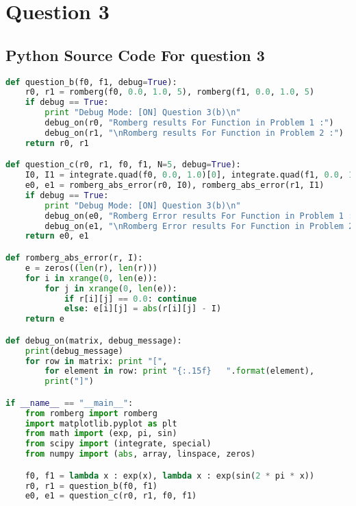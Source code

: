 \documentclass{article}
\begin{document}
\section*{Question 3}
\subsection*{Python Source Code For question 3}
\begin{lstlisting}[language=Python]
def question_b(f0, f1, debug=True):
    r0, r1 = romberg(f0, 0.0, 1.0, 5), romberg(f1, 0.0, 1.0, 5)
    if debug == True:
        print "Debug Mode: [ON] Question 3(b)\n"
        debug_on(r0, "Romberg results For Function in Problem 1 :")
        debug_on(r1, "\nRomberg results For Function in Problem 2 :")
    return r0, r1

def question_c(r0, r1, f0, f1, N=5, debug=True):
    I0, I1 = integrate.quad(f0, 0.0, 1.0)[0], integrate.quad(f1, 0.0, 1.0)[0]
    e0, e1 = romberg_abs_error(r0, I0), romberg_abs_error(r1, I1)
    if debug == True:
        print "Debug Mode: [ON] Question 3(b)\n"
        debug_on(e0, "Romberg Error results For Function in Problem 1 :")
        debug_on(e1, "\nRomberg Error results For Function in Problem 2 :")
    return e0, e1

def romberg_abs_error(r, I):
    e = zeros((len(r), len(r)))
    for i in xrange(0, len(e)):
        for j in xrange(0, len(e)):
            if r[i][j] == 0.0: continue
            else: e[i][j] = abs(r[i][j] - I)
    return e

def debug_on(matrix, debug_message):
    print(debug_message)
    for row in matrix: print "[",
        for element in row: print "{:.15f}   ".format(element),
        print("]")

if __name__ == "__main__":
    from romberg import romberg
    import matplotlib.pyplot as plt
    from math import (exp, pi, sin)
    from scipy import (integrate, special)
    from numpy import (abs, array, linspace, zeros)

    f0, f1 = lambda x : exp(x), lambda x : exp(sin(2 * pi * x))
    r0, r1 = question_b(f0, f1)
    e0, e1 = question_c(r0, r1, f0, f1)
\end{lstlisting}
\end{document}
